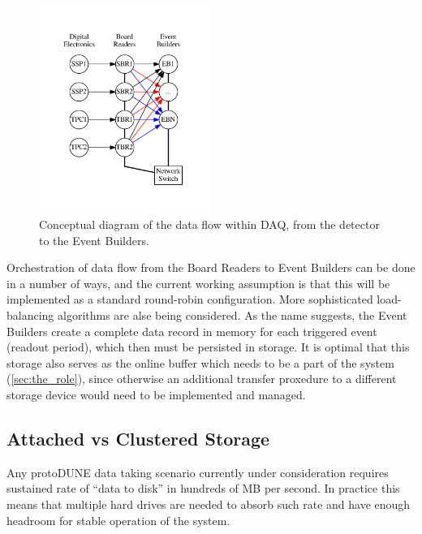 \documentclass[pdftex,12pt,letter]{article}
\newcommand{\pd}{protoDUNE\xspace}
\begin{document}
\begin{figure}[tbh]
  \centering
  \includegraphics[width=0.5\textwidth]{figures/upstream.pdf}
  \caption{Conceptual diagram of the data flow within DAQ, from the detector to the Event Builders.}
  \label{fig:upstream}
\end{figure}
\noindent Orchestration of data flow from the Board Readers to Event Builders can be done in a number
of ways, and the current working assumption is that this will be implemented as a standard round-robin
configuration. More sophisticated load-balancing algorithms are alse being considered. As the name suggests,
the Event Builders create a complete data record in memory for each triggered event (readout period),
which then must be persisted in storage. It is optimal that  this storage also serves as the online buffer 
 which needs to be a part of the system (\ref{sec:the_role}), since otherwise an additional transfer proxedure
to a different storage device would need to be implemented and managed.

\subsection{Attached vs Clustered Storage}
Any \pd data taking scenario currently under consideration requires sustained rate
of ``data to disk'' in hundreds of MB per second. In practice this means that
multiple hard drives are needed to absorb such rate and have enough headroom
for stable operation of the system.
\end{document}
